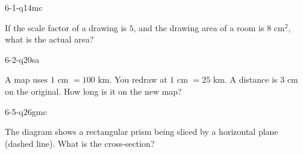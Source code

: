 \begin{practiceQuestion}{6-1-q14}{mc}
\begin{questionText}
If the scale factor of a drawing is $5$, and the drawing area of a room is $8$ cm$^2$, what is the actual area?
\end{questionText}
\end{practiceQuestion}

\begin{practiceQuestion}{6-2-q20}{sa}
\begin{questionText}
A map uses $1$ cm $= 100$ km. You redraw at $1$ cm $= 25$ km. A distance is $3$ cm on the original. How long is it on the new map?
\end{questionText}
\end{practiceQuestion}

\begin{practiceQuestion}{6-5-q26}{gmc}
\begin{questionText}
The diagram shows a rectangular prism being sliced by a horizontal plane (dashed line). What is the cross-section?

\begin{center}
\end{center}
\end{questionText}
\end{practiceQuestion}

